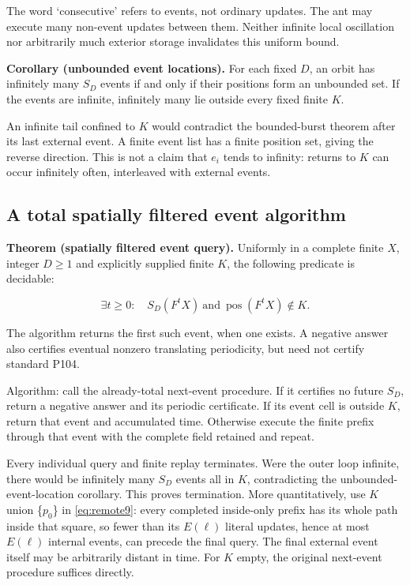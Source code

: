 \documentclass[
  11pt,
]{article}
\begin{document}
The word `consecutive' refers to events, not ordinary updates. The ant
may execute many non-event updates between them. Neither infinite local
oscillation nor arbitrarily much exterior storage invalidates this
uniform bound.

\textbf{Corollary (unbounded event locations).} For each
fixed \(D\), an orbit has infinitely many $S_D$ events if and only if their
positions form an unbounded set. If the events are infinite, infinitely
many lie outside every fixed finite \(K\).

An infinite tail confined to \(K\) would contradict the bounded-burst theorem after its last
external event. A finite event list has a finite position set, giving
the reverse direction. This is not a claim that $e_i$ tends to infinity:
returns to \(K\) can occur infinitely often, interleaved with external
events.

\subsection{A total spatially filtered event
algorithm}\label{remote-5}

\textbf{Theorem (spatially filtered event query).} Uniformly in a complete finite \(X\), integer
$D\ge1$ and explicitly supplied finite \(K\), the following
predicate is decidable:

\begin{equation}\label{eq:remote10}
\exists t\ge0:\quad S_D(F^tX)\ \text{and}\ \operatorname{pos}(F^tX)\notin K.
\end{equation}

The algorithm returns the first such event, when one exists. A negative
answer also certifies eventual nonzero translating periodicity, but need
not certify standard P104.

Algorithm: call the already-total next-event procedure. If it certifies
no future $S_D$, return a negative answer and its periodic certificate.
If its event cell is outside \(K\), return that event and accumulated time.
Otherwise execute the finite prefix through that event with the complete
field retained and repeat.

Every individual query and finite replay terminates. Were the outer loop
infinite, there would be infinitely many $S_D$ events all in \(K\),
contradicting the unbounded-event-location corollary. This proves termination. More
quantitatively, use \(K\) union \{$p_0$\} in \eqref{eq:remote9}: every completed
inside-only prefix has its whole path inside that square, so fewer than
its \(E(\ell)\) literal updates, hence at most \(E(\ell)\) internal events, can
precede the final query. The final external event itself may be
arbitrarily distant in time. For \(K\) empty, the original next-event
procedure suffices directly.
\end{document}

